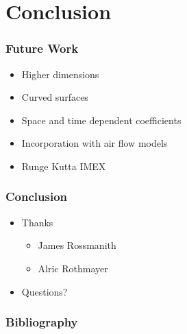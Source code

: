 \documentclass[10pt]{beamer}
\begin{document}
  \section{Conclusion}
    \begin{frame}
      \frametitle{Future Work}
      \begin{itemize}
        \item Higher dimensions
        \item Curved surfaces
        \item Space and time dependent coefficients
        \item Incorporation with air flow models
        \item Runge Kutta IMEX
      \end{itemize}
    \end{frame}

    \begin{frame}
      \frametitle{Conclusion}
      \begin{itemize}
        \item Thanks
          \begin{itemize}
            \item James Rossmanith
            \item Alric Rothmayer
          \end{itemize}
        \item Questions?
      \end{itemize}
    \end{frame}

    \begin{frame}
      \frametitle{Bibliography}
      \nocite{*}
      \printbibliography{}
    \end{frame}
\end{document}
